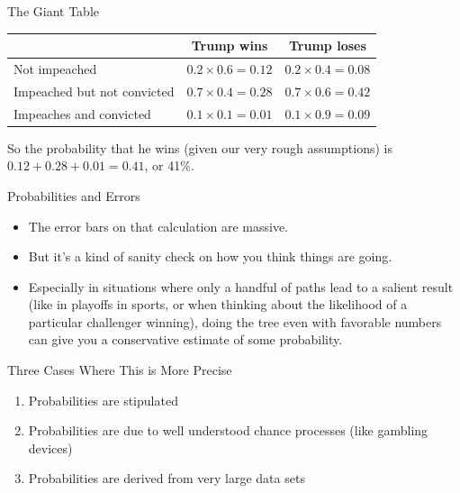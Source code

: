 \documentclass[
  ignorenonframetext,
]{beamer}
\providecommand{\tightlist}{%
  \setlength{\itemsep}{0pt}\setlength{\parskip}{0pt}}
\renewcommand{\,}{\text{, }}
\begin{document}
\begin{frame}{The Giant Table}
\protect\hypertarget{the-giant-table}{}

\begin{longtable}[]{@{}lcc@{}}
\toprule
& Trump wins & Trump loses\tabularnewline
\midrule
\endhead
Not impeached & \(0.2 \times 0.6 = 0.12\) &
\(0.2 \times 0.4 = 0.08\)\tabularnewline
Impeached but not convicted & \(0.7 \times 0.4 = 0.28\) &
\(0.7 \times 0.6 = 0.42\)\tabularnewline
Impeaches and convicted & \(0.1 \times 0.1 = 0.01\) &
\(0.1 \times 0.9 = 0.09\)\tabularnewline
\bottomrule
\end{longtable}

So the probability that he wins (given our very rough assumptions) is
\(0.12 + 0.28 + 0.01 = 0.41\), or 41\%.

\end{frame}

\begin{frame}{Probabilities and Errors}
\protect\hypertarget{probabilities-and-errors}{}

\begin{itemize}
\tightlist
\item
  The error bars on that calculation are massive.
\item
  But it's a kind of sanity check on how you think things are going.
\item
  Especially in situations where only a handful of paths lead to a
  salient result (like in playoffs in sports, or when thinking about the
  likelihood of a particular challenger winning), doing the tree even
  with favorable numbers can give you a conservative estimate of some
  probability.
\end{itemize}

\end{frame}

\begin{frame}{Three Cases Where This is More Precise}
\protect\hypertarget{three-cases-where-this-is-more-precise}{}

\begin{enumerate}
\tightlist
\item
  Probabilities are stipulated
\item
  Probabilities are due to well understood chance processes (like
  gambling devices)
\item
  Probabilities are derived from very large data sets
\end{enumerate}

\end{frame}
\end{document}
